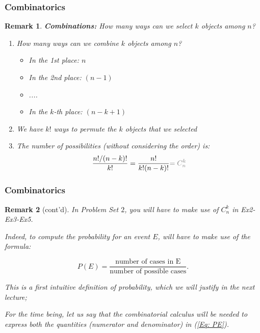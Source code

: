\documentclass[notes=show]{beamer}\usepackage[]{graphicx}\usepackage[]{color}
\newtheorem{remark}{Remark}[section]
\begin{document}
\begin{frame}
\frametitle{Combinatorics}

\begin{remark}
\textbf{Combinations:} How many ways can we select $k$ objects among $n$?
\begin{enumerate}
\item How many ways can we combine $k$ objects among $n$?
\begin{itemize}
\item In the 1st place: $n$
\item In the 2nd place: $(n-1)$
\item ....
\item In the $k$-th place: $(n-k+1)$
\end{itemize}

\item We have $k!$ ways to permute the $k$ objects that we selected
\item The number of possibilities (without considering the order) is:
$$
\frac{n!/(n-k)!}{k!} = \frac{n!}{k!(n-k)!} \color{gray}{=C^{k}_n}\color{black}
$$
\end{enumerate}
\end{remark}

\end{frame}

\begin{frame}
\frametitle{Combinatorics}

\begin{remark} [cont'd]

In Problem Set $2$, you will have to make use of $C^{k}_n$ in Ex2-Ex3-Ex5.

Indeed, to compute the probability for an event $E$, will have to make use of the formula:

\begin{equation} \label{Eq: PE}
P(E)=\dfrac{\text{number of cases in E}}{\text{number of possible cases}}.
\end{equation}

This is a first intuitive definition of probability, which we will justify in the next lecture;

For the time being, let us say that the combinatorial calculus will be needed to express both the quantities (numerator and denominator) in (\ref{Eq: PE}).

\end{remark}

\end{frame}
\end{document}

